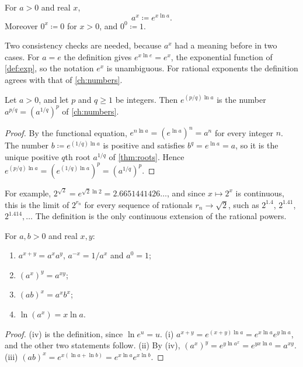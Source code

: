 \begin{definition}
\label{def:real-power}
For $a>0$ and real $x$,
\[
a^x\coloneqq e^{x\ln a} .
\]
Moreover $0^x\coloneqq0$ for $x>0$, and $0^0\coloneqq1$.
\end{definition}

Two consistency checks are needed, because $a^x$ had a meaning before in two cases. For $a=e$ the definition gives $e^{x\ln e}=e^x$, the exponential function of \cref{def:exp}, so the notation $e^x$ is unambiguous. For rational exponents the definition agrees with that of \cref{ch:numbers}.

\begin{proposition}
\label{prop:power-consistent}
Let $a>0$, and let $p$ and $q\ge1$ be integers. Then $e^{(p/q)\ln a}$ is the number $a^{p/q}=(a^{1/q})^p$ of \cref{ch:numbers}.
\end{proposition}

\begin{proof}
By the functional equation, $e^{n\ln a}=(e^{\ln a})^n=a^n$ for every integer $n$. The number $b\coloneqq e^{(1/q)\ln a}$ is positive and satisfies $b^q=e^{\ln a}=a$, so it is the unique positive $q$th root $a^{1/q}$ of \cref{thm:roots}. Hence $e^{(p/q)\ln a}=(e^{(1/q)\ln a})^p=(a^{1/q})^p$.
\end{proof}

For example, $2^{\sqrt2}=e^{\sqrt2\ln2}=2.6651441426\ldots$, and since $x\mapsto2^x$ is continuous, this is the limit of $2^{r_n}$ for every sequence of rationals $r_n\to\sqrt2$, such as $2^{1.4}$, $2^{1.41}$, $2^{1.414},\ldots$ The definition is the only continuous extension of the rational powers.

\begin{theorem}
\label{thm:exponent-laws}
For $a,b>0$ and real $x,y$:
\begin{enumerate}
\item $a^{x+y}=a^xa^y$, $a^{-x}=1/a^x$ and $a^0=1$;
\item $(a^x)^y=a^{xy}$;
\item $(ab)^x=a^xb^x$;
\item $\ln(a^x)=x\ln a$.
\end{enumerate}
\end{theorem}

\begin{proof}
(iv) is the definition, since $\ln e^u=u$. (i) $a^{x+y}=e^{(x+y)\ln a}=e^{x\ln a}e^{y\ln a}$, and the other two statements follow. (ii) By (iv), $(a^x)^y=e^{y\ln a^x}=e^{yx\ln a}=a^{xy}$. (iii) $(ab)^x=e^{x(\ln a+\ln b)}=e^{x\ln a}e^{x\ln b}$.
\end{proof}

